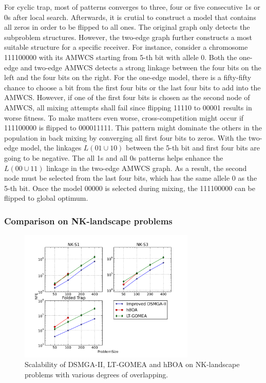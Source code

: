 \documentclass{sig-alternate-05-2015}
\begin{document}
For cyclic trap, most of patterns converges to three, four or five consecutive 1s or 0s after local search.
Afterwards, it is crutial to construct a model that contains all zeros in order to be flipped to all ones. 
The original graph only detects the subproblem structures. However, the two-edge graph further constructs a most suitable structure for a specific receiver. 
For instance, consider a chromosome 111100000 with its AMWCS starting from 5-th bit with allele 0.
Both the one-edge and two-edge AMWCS detects a strong linkage between the four bits on the left and the four bits on the right.
For the one-edge model, there is a fifty-fifty chance to choose a bit from the first four bits or the last four bits to add into the AMWCS. 
However, if one of the first four bits is chosen as the second node of AMWCS, all mixing attempts shall fail since flipping 11110 to 00001 results in worse fitness.
To make matters even worse, cross-competition might occur if 111100000 is flipped to 000011111. 
This pattern might dominate the others in the population in back mixing by converging all first four bits to zeros.
With the two-edge model, the linkages $L(01\cup10)$ between the 5-th bit and first four bits are going to be negative. 
The all 1s and all 0s patterns helps enhance the $L(00\cup11)$ linkage in the two-edge AMWCS graph.
As a result, the second node must be selected from the last four bits, which has the same allele 0 as the 5-th bit.
Once the model 00000 is selected during mixing, the 111100000 can be flipped to global optimum.


\subsubsection{ Comparison on NK-landscape problems }

\begin{figure}
\centering
\includegraphics[width=3.3in]{nkResults}
\caption{Scalability of DSMGA-II, LT-GOMEA and hBOA on NK-landscape problems with various degrees of overlapping.}
\end{figure}
\end{document}
